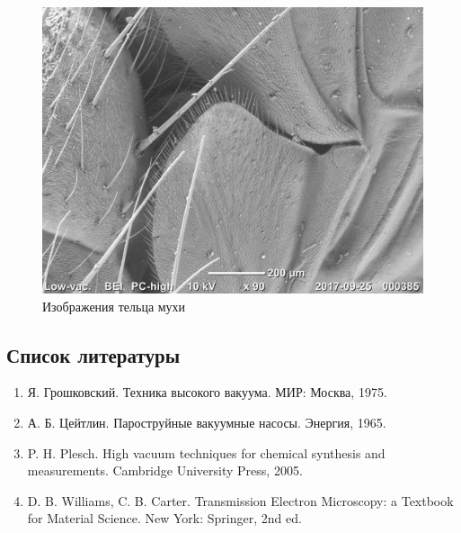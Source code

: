 \documentclass[12pt]{article}
\begin{document}
\begin{figure}
	\includegraphics[scale=0.65]{pictures/20170925_000385.jpg}
	\caption{Изображения тельца мухи}
\end{figure}

\subsection*{Список литературы}

\begin{enumerate}
	\item Я. Грошковский. Техника высокого вакуума. МИР: Москва, 1975.
	\item А. Б. Цейтлин. Пароструйные вакуумные насосы. Энергия, 1965.
	\item P. H. Plesch. High vacuum techniques for chemical synthesis and measurements. Cambridge University Press, 2005.
	\item D. B. Williams, C. B. Carter. Transmission Electron Microscopy: a Textbook for Material Science. New York: Springer, 2nd ed.
\end{enumerate}
\end{document}
